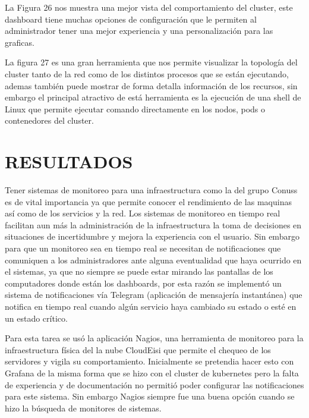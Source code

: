       La Figura 26 nos muestra una mejor vista del comportamiento del cluster, este dashboard tiene muchas opciones de configuración que le permiten al administrador tener una mejor experiencia y una personalización para las graficas.
      
      La figura 27 es una gran herramienta que nos permite visualizar la topología del cluster tanto de la red como de los distintos procesos que se están ejecutando, ademas también puede mostrar de forma detalla información de los recursos, sin embargo el principal atractivo de está herramienta es la ejecución de una shell de Linux que permite ejecutar comando directamente en los nodos, pods o contenedores del cluster.
      
      
      	
      
     
      
      
      
      
    
  

    

    
    
    

    
    
    
   
        
    \section{RESULTADOS}
    Tener sistemas de monitoreo para una infraestructura como la del grupo Conuss es de vital importancia ya que permite conocer el rendimiento de las maquinas así como de los servicios y la red. Los sistemas de monitoreo en tiempo real facilitan aun más la administración de la infraestructura la toma de decisiones en situaciones de incertidumbre y mejora la experiencia con el usuario. Sin embargo para que un monitoreo sea en tiempo real se necesitan de notificaciones que comuniquen a los administradores ante alguna eventualidad que haya ocurrido en el sistemas, ya que no siempre se puede estar mirando las pantallas de los computadores donde están los dashboards, por esta razón se implementó un sistema de notificaciones vía Telegram (aplicación de mensajería instantánea) que notifica en tiempo real cuando algún servicio haya cambiado su estado o esté en un estado crítico. 
    
    Para esta tarea se usó la aplicación Nagios, una herramienta de monitoreo para la infraestructura física del la nube CloudEisi que permite el chequeo de los servidores y vigila su comportamiento. Inicialmente se pretendia hacer esto con Grafana de la misma forma que se hizo con el cluster de kubernetes pero la falta de experiencia y de documentación no permitió poder configurar las notificaciones para este sistema. Sin embargo Nagios siempre fue una buena opción cuando se hizo la búsqueda de monitores de sistemas.
    
